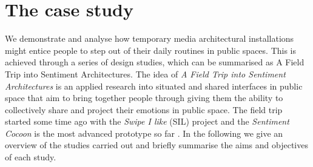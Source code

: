 \section{The case study}
We demonstrate and analyse how temporary media architectural installations might entice people to step out of their daily routines in public spaces. This is achieved through a series of design studies, which can be summarised as {A Field Trip into Sentiment Architectures}. 
The idea of \textit{A Field Trip into Sentiment Architectures} is an applied research into situated and shared interfaces in public space that aim to bring together people through giving them the ability to collectively share and project their emotions in public space. The field trip started some time ago with the \textit{Swipe I like} (SIL) project and the \textit{Sentiment Cocoon} is the most advanced prototype so far \label{study_overview}. In the following we give an overview of the studies carried out and briefly summarise the aims and objectives of each study. 


\begin{table}[h!]
\centering
{}
\caption[Overview of conducted design studies]{Overview of conducted design studies including the types of electronic surfaces.}
\label{study_overview}
\end{table}

